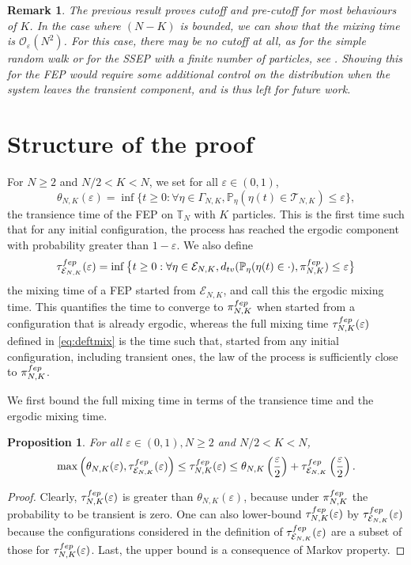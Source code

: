 \documentclass[11pt,a4paper]{article}
\newcommand{\T}{\mathbb{T}}
\renewcommand{\P}{\mathbb{P}}
\newcommand{\FEP}{\textsc{fep}}
\newtheorem{proposition}[theorem]{Proposition}
\newtheorem{remark}{Remark}[section]
\newcommand{\eqs}[1]{\begin{equation}#1\end{equation}}
\newcommand{\eq}[2]{\begin{equation}\label{#1}#2\end{equation}}
\begin{document}
\begin{remark}
The previous result proves cutoff and pre-cutoff for most behaviours of $K$. In the case where $(N-K)$ is bounded, we can show that the mixing time is $\mathcal{O}_{\varepsilon}(N^2)$. For this case, there may be no cutoff at all, as for the simple random walk or for the SSEP with a finite number of particles, see \cite[Remark 1.3]{lacoin_simple_2017}. Showing this for the FEP would require some additional control on the distribution when the system leaves the transient component, and is thus left for future work. 
\end{remark}

\section{Structure of the proof} \label{sec:not_struc}
For $N \ge 2$ and $N/2<K<N$, we set for all $\varepsilon \in (0,1)$,
\eqs{\theta_{N,K}(\varepsilon) = \inf \big\{t \ge 0 : \forall \eta \in \Gamma_{N,K}, \P_{\eta}(\eta(t) \in \mathcal{T}_{N,K}) \le \varepsilon\big\},}
the transience time of the FEP on $\T_N$ with $K$ particles. This is the first time such that for any initial configuration, the process has reached the ergodic component with probability greater than $1-\varepsilon$.
We also define
\eqs{\tau^{\FEP}_{\mathcal{E}_{N,K}}(\varepsilon) = \inf \big\{t \ge 0 : \forall \eta \in \mathcal{E}_{N,K}, d_{\textsc{tv}}(\P_\eta(\eta(t) \in \cdot), \pi_{N,K}^{\FEP}) \le \varepsilon \big\}}
the mixing time of a FEP started from $\mathcal{E}_{N,K}$, and call this the ergodic mixing time. 
This quantifies the time to converge to $\pi_{N,K}^{\FEP}$ when started from a configuration that is already ergodic, whereas the full mixing time $\tau^{\FEP}_{N,K}(\varepsilon)$ defined in \eqref{eq:deftmix} is the time such that, started from any initial configuration, including transient ones, the law of the process is sufficiently close to $\pi_{N,K}^{\FEP}$.

We first bound the full mixing time in terms of the transience time and the ergodic mixing time. 
\begin{proposition}\label{prop:easy} For all $\varepsilon \in (0,1), N \ge 2$ and $N/2 < K < N$,
\eq{eq:encadre}{\max\left(\theta_{N,K}(\varepsilon),\tau^{\FEP}_{\mathcal{E}_{N,K}}(\varepsilon)\right)\le \tau^{\FEP}_{N,K}(\varepsilon) \le \theta_{N,K}\left(\frac{\varepsilon}{2}\right) + \tau^{\FEP}_{\mathcal{E}_{N,K}}\left(\frac{\varepsilon}{2}\right).}
\end{proposition}
\begin{proof} Clearly, $\tau_{N,K}^{\FEP}(\varepsilon)$ is greater than $\theta_{N,K}(\varepsilon)$, because under $\pi_{N,K}^{\FEP}$ the probability to be transient is zero. One can also lower-bound $\tau_{N,K}^{\FEP}(\varepsilon)$ by $\tau^{\FEP}_{\mathcal{E}_{N,K}}(\varepsilon)$ because the configurations considered in the definition of $\tau^{\FEP}_{\mathcal{E}_{N,K}}(\varepsilon)$ are a subset of those for $\tau^{\FEP}_{N,K}(\varepsilon)$. 
Last, the upper bound is a consequence of Markov property.
\end{proof}
\end{document}
